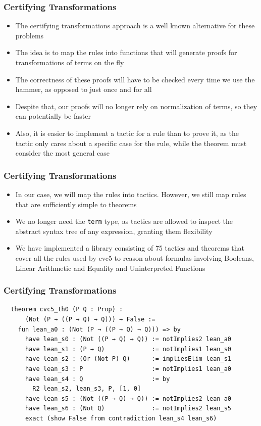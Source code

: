 \documentclass[usepdftitle=false,aspectratio=169,usenames,dvipsnames]{beamer}
\newcommand\vitem{\vfill\item}
\begin{document}
\begin{frame}
  \frametitle{Certifying Transformations}
  \begin{itemize}
    \item The certifying transformations approach is a well known alternative for these problems
    \vitem The idea is to map the rules into functions that will generate proofs for transformations of terms on the fly
    \vitem The correctness of these proofs will have to be checked every time we use the hammer, as opposed to just once and for all
    \vitem Despite that, our proofs will no longer rely on normalization of terms, so they can potentially be faster
    \vitem Also, it is easier to implement a tactic for a rule than to prove it, as the tactic only cares about a specific case for the rule, while the theorem must consider the most general case
  \end{itemize}
\end{frame}
\begin{frame}
  \frametitle{Certifying Transformations}
  \begin{itemize}
    \item In our case, we will map the rules into tactics. However, we still map rules that are sufficiently simple to theorems
    \vitem We no longer need the \texttt{term} type, as tactics are allowed to inspect the abstract syntax tree of any expression, granting them flexibility
    \vitem We have implemented a library consisting of 75 tactics and theorems that cover all the rules used by cvc5 to reason about formulas involving Booleans, Linear Arithmetic and Equality and Uninterpreted Functions
  \end{itemize}
\end{frame}

\begin{frame}[fragile]
  \frametitle{Certifying Transformations}
  \begin{verbatim}
  theorem cvc5_th0 (P Q : Prop) :
      (Not (P → ((P → Q) → Q))) → False :=
    fun lean_a0 : (Not (P → ((P → Q) → Q))) => by
      have lean_s0 : (Not ((P → Q) → Q)) := notImplies2 lean_a0
      have lean_s1 : (P → Q)             := notImplies1 lean_s0
      have lean_s2 : (Or (Not P) Q)      := impliesElim lean_s1
      have lean_s3 : P                   := notImplies1 lean_a0
      have lean_s4 : Q                   := by
        R2 lean_s2, lean_s3, P, [1, 0]
      have lean_s5 : (Not ((P → Q) → Q)) := notImplies2 lean_a0
      have lean_s6 : (Not Q)             := notImplies2 lean_s5
      exact (show False from contradiction lean_s4 lean_s6)
  \end{verbatim}
\end{frame}
\end{document}
